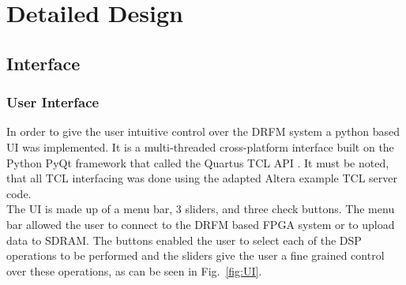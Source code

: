 \section{Detailed Design}
	\subsection{Interface}
		\subsubsection{User Interface}
		In order to give the user intuitive control over the DRFM system a python based UI was implemented. It is a multi-threaded cross-platform interface built on the Python PyQt framework that called the Quartus TCL API \cite{PyQt} \cite{STP}. It must be noted, that all TCL interfacing was done using the adapted Altera example TCL server code\cite{TCL}.  \\ \newline The UI is made up of a menu bar, 3 sliders, and three check buttons. The menu bar allowed the user to connect to the DRFM based FPGA system or to upload data to SDRAM. The buttons enabled the user to select each of the DSP operations to be performed and the sliders give the user a fine grained control over these operations, as can be seen in Fig.~\ref{fig:UI}. 
		
